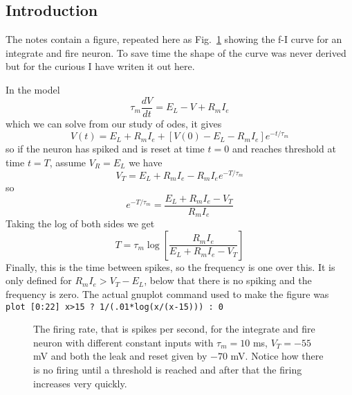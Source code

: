 \documentclass[11pt,a4paper]{scrartcl}
\begin{document}
\subsection*{Introduction}

The notes contain a figure, repeated here as Fig.~\ref{f_i_curve}
showing the f-I curve for an integrate and fire neuron. To save time
the shape of the curve was never derived but for the curious I have
writen it out here.

In the model 
\begin{equation}
\tau_m\frac{dV}{dt}=E_L-V+R_mI_e
\end{equation}
which we can solve from our study of odes, it gives
\begin{equation}
V(t)=E_L+R_mI_e+[V(0)-E_L-R_mI_e]e^{-t/\tau_m}
\end{equation}
so if the neuron has spiked and is reset at time $t=0$ and reaches
threshold at time $t=T$, assume $V_R=E_L$ we have
\begin{equation}
V_T=E_L+R_mI_e-R_mI_ee^{-T/\tau_m}
\end{equation}
so 
\begin{equation}
e^{-T/\tau_m}=\frac{E_L+R_mI_e-V_T}{R_mI_e}
\end{equation}
Taking the log of both sides we get
\begin{equation}
T=\tau_m\log\left[\frac{R_mI_e}{E_L+R_mI_e-V_T}\right]
\end{equation}
Finally, this is the time between spikes, so the frequency is one over this. It is only defined for $R_mI_e>V_T-E_L$, below that there is no spiking and the frequency is zero. The actual gnuplot command used to make the figure was\\
\texttt{plot [0:22] x>15 ? 1/(.01*log(x/(x-15))) : 0}

\begin{figure}
\begin{center}

\end{center}
\caption{The firing rate, that is spikes per second, for the integrate
  and fire neuron with different constant inputs with $\tau_m=10$ ms,
  $V_T=-55$ mV and both the leak and reset given by $-70$ mV. Notice
  how there is no firing until a threshold is reached and after that
  the firing increases very quickly. \label{f_i_curve}}
\end{figure}
\end{document}
